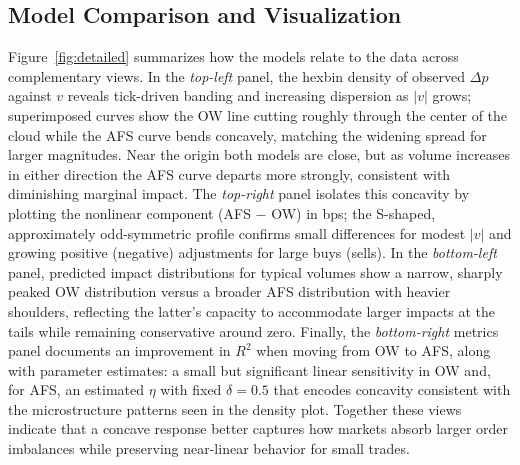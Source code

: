 \documentclass{article}
\begin{document}
\subsection{Model Comparison and Visualization}
Figure~\ref{fig:detailed} summarizes how the models relate to the data across complementary views. In the \emph{top-left} panel, the hexbin density of observed $\Delta p$ against $v$ reveals tick-driven banding and increasing dispersion as $|v|$ grows; superimposed curves show the OW line cutting roughly through the center of the cloud while the AFS curve bends concavely, matching the widening spread for larger magnitudes. Near the origin both models are close, but as volume increases in either direction the AFS curve departs more strongly, consistent with diminishing marginal impact. The \emph{top-right} panel isolates this concavity by plotting the nonlinear component (AFS $-$ OW) in bps; the S-shaped, approximately odd-symmetric profile confirms small differences for modest $|v|$ and growing positive (negative) adjustments for large buys (sells). In the \emph{bottom-left} panel, predicted impact distributions for typical volumes show a narrow, sharply peaked OW distribution versus a broader AFS distribution with heavier shoulders, reflecting the latter's capacity to accommodate larger impacts at the tails while remaining conservative around zero. Finally, the \emph{bottom-right} metrics panel documents an improvement in $R^2$ when moving from OW to AFS, along with parameter estimates: a small but significant linear sensitivity in OW and, for AFS, an estimated $\eta$ with fixed $\delta=0.5$ that encodes concavity consistent with the microstructure patterns seen in the density plot. Together these views indicate that a concave response better captures how markets absorb larger order imbalances while preserving near-linear behavior for small trades.
\end{document}
